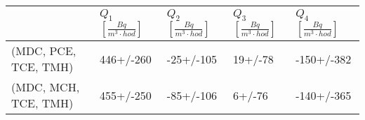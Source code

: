 \begin{tabular}{lllll}
\toprule
{} & $Q_1$ $\left[\si{\frac{Bq}{m^3\cdot hod}}\right]$ & $Q_2$ $\left[\si{\frac{Bq}{m^3\cdot hod}}\right]$ & $Q_3$ $\left[\si{\frac{Bq}{m^3\cdot hod}}\right]$ & $Q_4$ $\left[\si{\frac{Bq}{m^3\cdot hod}}\right]$ \\
\midrule
(MDC, PCE, TCE, TMH) &                                         446+/-260 &                                         -25+/-105 &                                           19+/-78 &                                        -150+/-382 \\
(MDC, MCH, TCE, TMH) &                                         455+/-250 &                                         -85+/-106 &                                            6+/-76 &                                        -140+/-365 \\
\bottomrule
\end{tabular}

